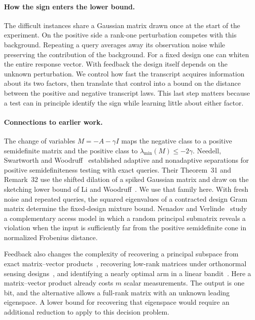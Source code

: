 \paragraph{How the sign enters the lower bound.}
The difficult instances share a Gaussian matrix drawn once at the start of the experiment. On the positive side a rank-one perturbation competes with this background. Repeating a query averages away its observation noise while preserving the contribution of the background. For a fixed design one can whiten the entire response vector. With feedback the design itself depends on the unknown perturbation. We control how fast the transcript acquires information about its two factors, then translate that control into a bound on the distance between the positive and negative transcript laws. This last step matters because a test can in principle identify the sign while learning little about either factor.

\paragraph{Connections to earlier work.}
The change of variables \(M=-A-\gamma I\) maps the negative class to a positive semidefinite matrix and the positive class to \(\lambda_{\min}(M)\le-2\gamma\). Needell, Swartworth and Woodruff~\cite{needell2022} established adaptive and nonadaptive separations for positive semidefiniteness testing with exact queries. Their Theorem~31 and Remark~32 use the shifted dilation of a spiked Gaussian matrix and draw on the sketching lower bound of Li and Woodruff~\cite{li2016}. We use that family here. With fresh noise and repeated queries, the squared eigenvalues of a contracted design Gram matrix determine the fixed-design mixture bound. Nenadov and Verlinde~\cite{nenadov2026} study a complementary access model in which a random principal submatrix reveals a violation when the input is sufficiently far from the positive semidefinite cone in normalized Frobenius distance.

Feedback also changes the complexity of recovering a principal subspace from exact matrix--vector products~\cite{simchowitz2018}, recovering low-rank matrices under orthonormal sensing designs~\cite{kacham2024}, and identifying a nearly optimal arm in a linear bandit~\cite{maiti2026}. Here a matrix--vector product already costs \(m\) scalar measurements. The output is one bit, and the alternative allows a full-rank matrix with an unknown leading eigenspace. A lower bound for recovering that eigenspace would require an additional reduction to apply to this decision problem.

